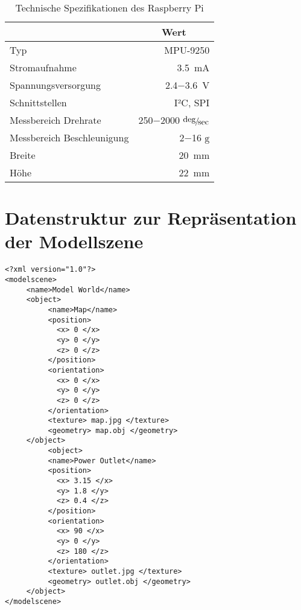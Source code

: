 \begin{table}[ht]
\begin{center}
\begin{tabular}{|l|r|}
\hline
\rowcolor{lightgray} \multicolumn{1}{|c|}{\textbf{Spezifikation}} & \multicolumn{1}{|c|}{\textbf{Wert}}\\
\hline
Typ & MPU-9250 \\
\hline
Stromaufnahme & \SI{3,5}{\milli\ampere} \\
\hline
Spannungsversorgung & \SI{2,4}{}$-$\SI{3,6}{\volt} \\
\hline
Schnittstellen & I²C, SPI \\
\hline
Messbereich Drehrate & \SI{250}{}$-$\SI{2000}{} $\nicefrac{\deg}{\sec}$\\
\hline
Messbereich Beschleunigung &  \SI{2}{}$-$\SI{16}{} $\mathrm{g}$\\
\hline
Breite & \SI{20}{\milli\meter} \\
\hline
Höhe & \SI{22}{\milli\meter}\\
\hline
\end{tabular}
\caption{Technische Spezifikationen des Raspberry Pi}
\end{center}
\label{tab:imu}
\end{table}

\clearpage{}

\section{Datenstruktur zur Repräsentation der Modellszene}
\label{app.datastructure}
\begin{lstlisting}[label=source.data,caption=Datenstruktur zur Repräsentation der Modellszene]
<?xml version="1.0"?>
<modelscene>
     <name>Model World</name>
     <object>
          <name>Map</name>
          <position>
          	<x> 0 </x>
          	<y> 0 </y>
          	<z> 0 </z>
          </position>
          <orientation>
          	<x> 0 </x>
          	<y> 0 </y>
          	<z> 0 </z>
          </orientation>
          <texture> map.jpg </texture>
          <geometry> map.obj </geometry>
     </object>
          <object>
          <name>Power Outlet</name>
          <position>
          	<x> 3.15 </x>
          	<y> 1.8 </y>
          	<z> 0.4 </z>
          </position>
          <orientation>
          	<x> 90 </x>
          	<y> 0 </y>
          	<z> 180 </z>
          </orientation>
          <texture> outlet.jpg </texture>
          <geometry> outlet.obj </geometry>
     </object>
</modelscene>
\end{lstlisting}

\clearpage{}

%

%
%
